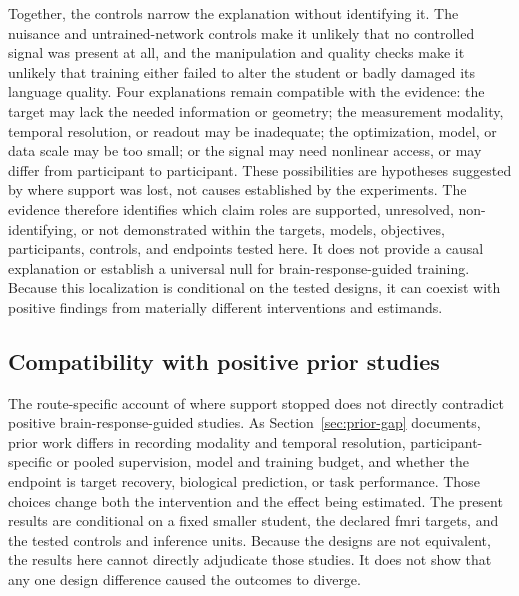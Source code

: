 Together, the controls narrow the explanation without identifying it.
The nuisance and untrained-network controls make it unlikely that no controlled signal was present at all, and the manipulation and quality checks make it unlikely that training either failed to alter the student or badly damaged its language quality.
Four explanations remain compatible with the evidence: the target may lack the needed information or geometry; the measurement modality, temporal resolution, or readout may be inadequate; the optimization, model, or data scale may be too small; or the signal may need nonlinear access, or may differ from participant to participant.
These possibilities are hypotheses suggested by where support was lost, not causes established by the experiments.
The evidence therefore identifies which claim roles are supported, unresolved, non-identifying, or not demonstrated within the targets, models, objectives, participants, controls, and endpoints tested here.
It does not provide a causal explanation or establish a universal null for brain-response-guided training.
Because this localization is conditional on the tested designs, it can coexist with positive findings from materially different interventions and estimands.

\subsection{Compatibility with positive prior studies}
\label{sec:discussion-prior}

The route-specific account of where support stopped does not directly contradict positive brain-response-guided studies.
As Section~\ref{sec:prior-gap} documents, prior work differs in recording modality and temporal resolution, participant-specific or pooled supervision, model and training budget, and whether the endpoint is target recovery, biological prediction, or task performance.
Those choices change both the intervention and the effect being estimated.
The present results are conditional on a fixed smaller student, the declared \ac{fmri} targets, and the tested controls and inference units.
Because the designs are not equivalent, the results here cannot directly adjudicate those studies.
It does not show that any one design difference caused the outcomes to diverge.

